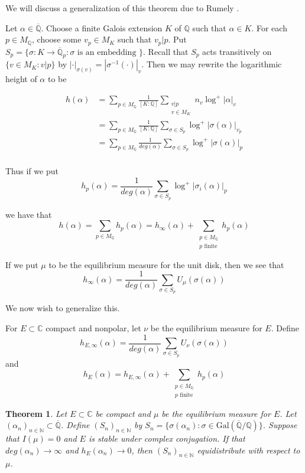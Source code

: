 \documentclass{amsart}
\newtheorem{thm}{Theorem}[section]
\newcommand{\sbs}{\subset}
\newcommand{\N}{\mathbb{N}}
\newcommand{\C}{\mathbb{C}}
\newcommand{\Q}{\mathbb{Q}}
\newcommand{\ol}{\overline}
\begin{document}
We will discuss a generalization of this theorem due to Rumely \cite{R}. 

Let $\alpha \in \ol{\Q}$. Choose a finite Galois extension $K$ of $\Q$ such that $\alpha \in K$. For each $p \in M_{\Q}$, choose some $v_p \in M_K$ such that $v_p|p$. Put $S_p = \{\sigma :K \rightarrow \ol{\Q}_p: \sigma \text{ is an embedding }\}$. Recall that $S_p$ acts transitively on $\{v \in M_K: v|p\}$ by $|\cdot|_{\sigma(v)} = |\sigma^{-1}( \cdot)|_v$. Then we may rewrite the logarithmic height of $\alpha$ to be 

\begin{align*}
h(\alpha)
&= \sum_{p \in M_{\Q}} \frac{1}{[K:\Q]} \sum_{\substack{v|p\\v \in M_K}}n_v \log^+|\alpha|_v\\
&= \sum_{p \in M_{\Q}} \frac{1}{[K:\Q]} \sum_{\sigma \in S_p} \log^+ |\sigma(\alpha)|_{v_p}\\
&= \sum_{p \in M_{\Q}} \frac{1}{deg(\alpha)}\sum_{\sigma \in S_p} \log^+ |\sigma(\alpha)|_{p}\\
\end{align*}

Thus if we put $$h_p(\alpha) = \frac{1}{deg(\alpha)}\sum_{\sigma \in S_p} \log^+ |\sigma_i(\alpha)|_{p}$$ 

we have that $$h(\alpha) = \sum_{p \in M_{\Q}} h_p(\alpha) = h_{\infty}(\alpha) + \sum_{\substack{p \in M_{\Q}\\ p \text{ finite}}} h_p(\alpha)$$

If we put $\mu$ to be the equilibrium measure for the unit disk, then we see that $$h_{\infty}(\alpha) = \frac{1}{deg(\alpha)} \sum_{\sigma \in S_p} U_{\mu}(\sigma(\alpha))$$

We now wish to generalize this.

For $E \sbs \C$ compact and nonpolar, let $\nu$ be the equilibrium measure for $E$. Define $$h_{E,\infty}(\alpha) = \frac{1}{deg(\alpha)} \sum_{\sigma \in S_p} U_{\nu}(\sigma(\alpha))$$ and $$h_E(\alpha) = h_{E,\infty}(\alpha) + \sum_{\substack{p \in M_{\Q}\\ p \text{ finite}}} h_p(\alpha)$$

\begin{thm}

Let $E \sbs \C $ be compact and $\mu$ be the equilibrium measure for $E$. Let $(\alpha_n)_{n \in \N} \sbs \ol{\Q}$. Define $(S_n)_{n \in \N}$ by $S_n = \{\sigma(\alpha_n): \sigma \in \mathrm{Gal}(\ol{ \Q }/ \Q )\}$. Suppose that $I(\mu) = 0$ and $E$ is stable under complex conjugation. If that $deg(\alpha_n) \rightarrow \infty$ and $h_E(\alpha_n) \rightarrow 0$, then $(S_n)_{n \in \N}$ equidistribute with respect to $\mu$. 

\end{thm}
\end{document}
